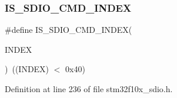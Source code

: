 \subsubsection{\texorpdfstring{I\+S\+\_\+\+S\+D\+I\+O\+\_\+\+C\+M\+D\+\_\+\+I\+N\+D\+EX}{IS\_SDIO\_CMD\_INDEX}}
{\footnotesize\ttfamily \#define I\+S\+\_\+\+S\+D\+I\+O\+\_\+\+C\+M\+D\+\_\+\+I\+N\+D\+EX(\begin{DoxyParamCaption}\item[{}]{I\+N\+D\+EX }\end{DoxyParamCaption})~((I\+N\+D\+EX) $<$ 0x40)}



Definition at line 236 of file stm32f10x\+\_\+sdio.\+h.


